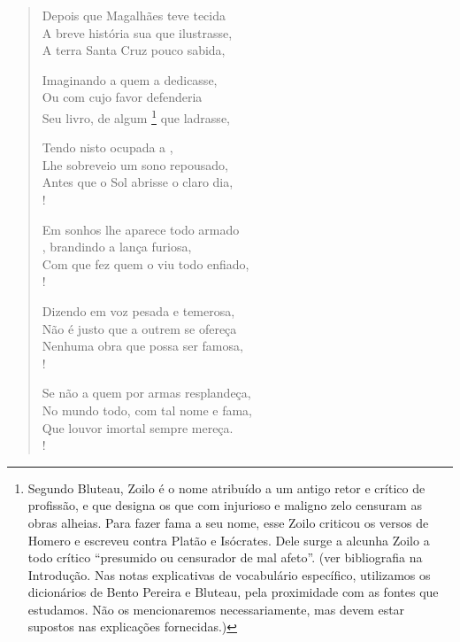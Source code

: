 \settowidth{\versewidth}{Guerras, deixaram o estudo um breve espaço,xjissj}
\begin{verse}
Depois que Magalhães teve tecida\\		%
A breve história sua que ilustrasse,\\
A terra Santa Cruz pouco sabida,

Imaginando a quem a dedicasse,\\
Ou com cujo favor defenderia\\
Seu livro, de algum \footnote{ Segundo Bluteau, Zoilo é o nome
atribuído a um antigo retor e crítico de profissão, e que designa 
os que com injurioso e maligno zelo censuram as obras
alheias. Para fazer fama a seu nome, esse Zoilo criticou os versos de
Homero e escreveu contra Platão e Isócrates. Dele surge a alcunha Zoilo
a todo crítico ``presumido ou censurador de mal
afeto''. (ver bibliografia na Introdução. Nas notas explicativas de
vocabulário específico, utilizamos os dicionários de Bento Pereira e
Bluteau, pela proximidade com as fontes que estudamos. Não os
mencionaremos necessariamente, mas devem estar supostos nas explicações
fornecidas.)} que ladrasse,

Tendo nisto ocupada a ,\\
Lhe sobreveio um sono repousado,\\
Antes que o Sol abrisse o claro dia,\\!

Em sonhos lhe aparece todo armado\\
, brandindo a lança furiosa,\\
Com que fez quem o viu todo enfiado,\\!

Dizendo em voz pesada e temerosa,\\
Não é justo que a outrem se ofereça\\
Nenhuma obra que possa ser famosa,\\!

Se não a quem por armas resplandeça,\\
No mundo todo, com tal nome e fama,\\
Que louvor imortal sempre mereça.\\!


\end{verse}
